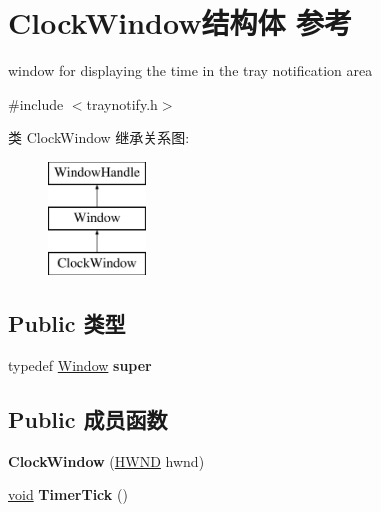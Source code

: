 \hypertarget{struct_clock_window}{}\section{Clock\+Window结构体 参考}
\label{struct_clock_window}


window for displaying the time in the tray notification area  




{\ttfamily \#include $<$traynotify.\+h$>$}

类 Clock\+Window 继承关系图\+:\begin{figure}[H]
\begin{center}
\leavevmode
\includegraphics[height=3.000000cm]{struct_clock_window}
\end{center}
\end{figure}
\subsection*{Public 类型}
\begin{DoxyCompactItemize}
\item 
\mbox{\label{struct_clock_window_a9ed962f599ea74dbd7e88b4949cd0bf8}} 
typedef \hyperlink{struct_window}{Window} {\bfseries super}
\end{DoxyCompactItemize}
\subsection*{Public 成员函数}
\begin{DoxyCompactItemize}
\item 
\mbox{\label{struct_clock_window_a7e8e479c636bc1387fe51b125b1a7d1d}} 
{\bfseries Clock\+Window} (\hyperlink{interfacevoid}{H\+W\+ND} hwnd)
\item 
\mbox{\label{struct_clock_window_a59c3f636b715f37dfd86c8de63191b17}} 
\hyperlink{interfacevoid}{void} {\bfseries Timer\+Tick} ()
\end{DoxyCompactItemize}
